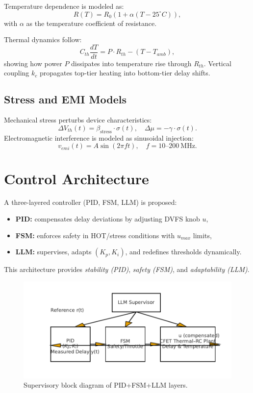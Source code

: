 \documentclass[conference]{IEEEtran}
\begin{document}
Temperature dependence is modeled as:
\begin{equation}
R(T) = R_0 \left( 1 + \alpha (T-25^\circ C) \right),
\end{equation}
with $\alpha$ as the temperature coefficient of resistance.  

Thermal dynamics follow:
\begin{equation}
C_{th}\frac{dT}{dt} = P \cdot R_{th} - (T - T_{amb}),
\end{equation}
showing how power $P$ dissipates into temperature rise through $R_{th}$.
Vertical coupling $k_c$ propagates top-tier heating into bottom-tier delay shifts.

\subsection{Stress and EMI Models}
Mechanical stress perturbs device characteristics:
\begin{equation}
\Delta V_{th}(t) = \beta_{\mathrm{stress}} \cdot \sigma(t), \quad
\Delta \mu = -\gamma \cdot \sigma(t).
\end{equation}
Electromagnetic interference is modeled as sinusoidal injection:
\begin{equation}
v_{emi}(t) = A \sin(2\pi f t), \quad f=10\text{--}200~\mathrm{MHz}.
\end{equation}

\section{Control Architecture}
A three-layered controller (PID, FSM, LLM) is proposed:
\begin{itemize}
  \item \textbf{PID:} compensates delay deviations by adjusting DVFS knob $u$,
  \item \textbf{FSM:} enforces safety in HOT/stress conditions with $u_{max}$ limits,
  \item \textbf{LLM:} supervises, adapts $(K_p,K_i)$, and redefines thresholds dynamically.
\end{itemize}
This architecture provides \emph{stability (PID)}, \emph{safety (FSM)}, and \emph{adaptability (LLM)}.

\begin{figure}[h]
\centering
\includegraphics[width=0.9\columnwidth]{control_arch.pdf}
\caption{Supervisory block diagram of PID+FSM+LLM layers.}
\label{fig:arch}
\end{figure}
\end{document}
